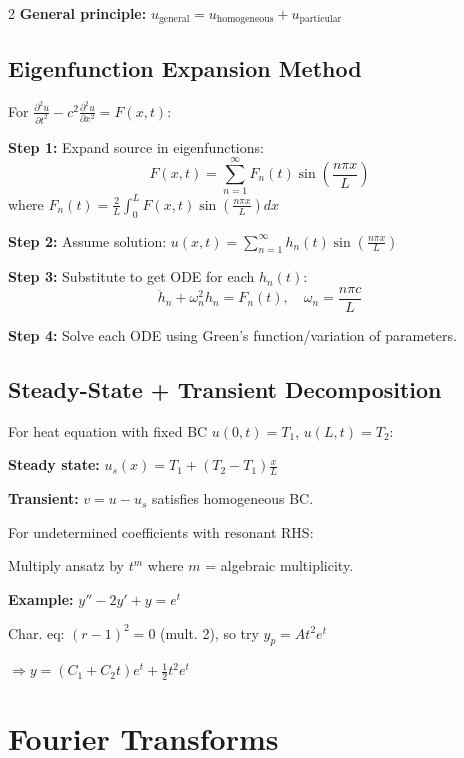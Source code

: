 \documentclass[10pt,a4paper]{article}
\begin{document}
\begin{multicols}{2}
\textbf{General principle:} $u_{\text{general}} = u_{\text{homogeneous}} + u_{\text{particular}}$

\subsection{Eigenfunction Expansion Method}
For $\displaystyle\frac{\partial^2 u}{\partial t^2} - c^2\frac{\partial^2 u}{\partial x^2} = F(x,t)$:

\textbf{Step 1:} Expand source in eigenfunctions:
\begin{equation}
F(x,t) = \sum_{n=1}^{\infty} F_n(t)\sin\left(\frac{n\pi x}{L}\right)
\end{equation}
where $\displaystyle F_n(t) = \frac{2}{L}\int_0^L F(x,t)\sin\left(\frac{n\pi x}{L}\right)dx$

\textbf{Step 2:} Assume solution:
$\displaystyle u(x,t) = \sum_{n=1}^{\infty} h_n(t)\sin\left(\frac{n\pi x}{L}\right)$

\textbf{Step 3:} Substitute to get ODE for each $h_n(t)$:
\begin{equation}
\ddot{h}_n + \omega_n^2 h_n = F_n(t), \quad \omega_n = \frac{n\pi c}{L}
\end{equation}

\textbf{Step 4:} Solve each ODE using Green's function/variation of parameters.

\subsection{Steady-State + Transient Decomposition}
For heat equation with fixed BC $u(0,t)=T_1$, $u(L,t)=T_2$:

\textbf{Steady state:} $u_s(x) = T_1 + (T_2-T_1)\frac{x}{L}$

\textbf{Transient:} $v = u - u_s$ satisfies homogeneous BC.

\begin{warning}
For undetermined coefficients with resonant RHS:

Multiply ansatz by $t^m$ where $m$ = algebraic multiplicity.

\textbf{Example:} $y'' - 2y' + y = e^t$

Char. eq: $(r-1)^2 = 0$ (mult. 2), so try $y_p = At^2 e^t$

$\Rightarrow y = (C_1 + C_2 t)e^t + \frac{1}{2}t^2 e^t$
\end{warning}

\section{Fourier Transforms}


\end{multicols}
\end{document}
